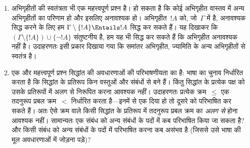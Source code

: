 \documentclass[../../../include/open-logic-section]{subfiles}
\begin{document}
\begin{explain}
\begin{enumerate}
  $\Gamma$ का कोई प्रतिरूप खोजकर हम जाँच सकते हैं कि ऐसा नहीं होता। यदि हमारे
  सिद्धांत के प्रतिरूप हैं, तो हम तार्किक विधियों से उनका अध्ययन और निर्माण
  दोनों कर सकते हैं।
\item अभिगृहीतों की स्वतंत्रता भी एक महत्त्वपूर्ण प्रश्न है। हो सकता है कि
  कोई अभिगृहीत वास्तव में अन्य अभिगृहीतों का परिणाम हो और इसलिए अनावश्यक हो।
  अभिगृहीत~$!A$ को, जो~$\Gamma$ में है, अनावश्यक सिद्ध करने के लिए हम $\Gamma \setminus
  \{!A\} \Entails !A$ सिद्ध कर सकते हैं। यह दिखाकर कि $(\Gamma \setminus \{!A\}) \cup \{\lnot
  !A\}$ संतुष्टनीय है, हम यह भी सिद्ध कर
  सकते हैं कि अभिगृहीत अनावश्यक नहीं है। उदाहरणतः इसी प्रकार दिखाया गया कि
  समांतर अभिगृहीत, ज्यामिति के अन्य अभिगृहीतों से स्वतंत्र है।
\item एक और महत्त्वपूर्ण प्रश्न सिद्धांत की अवधारणाओं की परिभाषणीयता का है:
  भाषा का चुनाव निर्धारित करता है कि सिद्धांत के प्रतिरूप किन वस्तुओं और
  संबंधों से बने हैं। किंतु सिद्धांत के प्रत्येक पक्ष को उसके प्रतिरूपों में
  अलग से निरूपित करना आवश्यक नहीं। उदाहरणतः प्रत्येक क्रम~$\le$ एक तदनुरूप
  प्रबल क्रम~$<$ निर्धारित करता है---इनमें से एक दिया हो तो दूसरे को परिभाषित
  कर सकते हैं। अतः ऐसे क्रम वाले किसी सिद्धांत के प्रतिरूप में तदनुरूप प्रबल
  क्रम का \emph{अलग से} होना आवश्यक नहीं। सामान्यतः एक संबंध को अन्य संबंधों
  के पदों में कब परिभाषित किया जा सकता है? और किसी संबंध को अन्य संबंधों के
  पदों में परिभाषित करना कब असंभव है (जिससे उसे भाषा की मूल अवधारणाओं में
  जोड़ना पड़े)?
\end{enumerate}
\end{explain}
\end{document}

